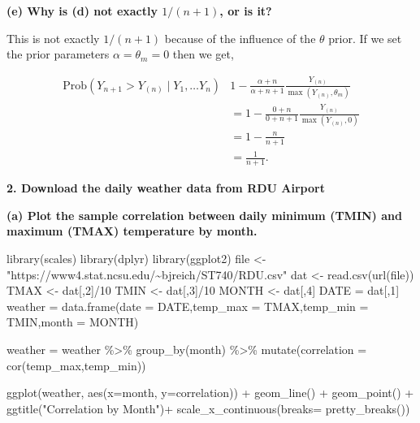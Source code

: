 \documentclass[
]{article}
\newenvironment{Shaded}{\begin{snugshade}}{\end{snugshade}}
\newcommand{\AttributeTok}[1]{\textcolor[rgb]{0.77,0.63,0.00}{#1}}
\newcommand{\DecValTok}[1]{\textcolor[rgb]{0.00,0.00,0.81}{#1}}
\newcommand{\FunctionTok}[1]{\textcolor[rgb]{0.00,0.00,0.00}{#1}}
\newcommand{\NormalTok}[1]{#1}
\newcommand{\OtherTok}[1]{\textcolor[rgb]{0.56,0.35,0.01}{#1}}
\newcommand{\SpecialCharTok}[1]{\textcolor[rgb]{0.00,0.00,0.00}{#1}}
\newcommand{\StringTok}[1]{\textcolor[rgb]{0.31,0.60,0.02}{#1}}
\begin{document}
\textbf{(e) Why is (d) not exactly \(1/(n+1)\), or is it?}

This is not exactly \(1/(n+1)\) because of the influence of the
\(\theta\) prior. If we set the prior parameters
\(\alpha = \theta_{m} = 0\) then we get,

\begin{align*}
\text{Prob}(Y_{n+1} > Y_{(n)} \mid Y_{1}, \dots Y_{n}) & 1 - \frac{\alpha +n  }{ \alpha + n + 1 } \frac{ Y_{(n)} }{  \max(Y_{(n)}, \theta_{m})} \\
  & = 1 - \frac{0 +n  }{ 0 + n + 1 } \frac{ Y_{(n)} }{  \max(Y_{(n)}, 0)} \\
  & = 1 - \frac{  n}{n+1  } \\
  & =\frac{ 1 }{  n+1}.
\end{align*}

\textbf{2. Download the daily weather data from RDU Airport}

\textbf{(a) Plot the sample correlation between daily minimum (TMIN) and
maximum (TMAX) temperature by month.}

\begin{Shaded}
\begin{Highlighting}[]
\FunctionTok{library}\NormalTok{(scales)}
\FunctionTok{library}\NormalTok{(dplyr)}
\FunctionTok{library}\NormalTok{(ggplot2)}
\NormalTok{file }\OtherTok{\textless{}{-}} \StringTok{"https://www4.stat.ncsu.edu/\textasciitilde{}bjreich/ST740/RDU.csv"}
\NormalTok{dat }\OtherTok{\textless{}{-}} \FunctionTok{read.csv}\NormalTok{(}\FunctionTok{url}\NormalTok{(file))}
\NormalTok{TMAX }\OtherTok{\textless{}{-}}\NormalTok{ dat[,}\DecValTok{2}\NormalTok{]}\SpecialCharTok{/}\DecValTok{10}
\NormalTok{TMIN }\OtherTok{\textless{}{-}}\NormalTok{ dat[,}\DecValTok{3}\NormalTok{]}\SpecialCharTok{/}\DecValTok{10}
\NormalTok{MONTH }\OtherTok{\textless{}{-}}\NormalTok{ dat[,}\DecValTok{4}\NormalTok{]}
\NormalTok{DATE }\OtherTok{=}\NormalTok{ dat[,}\DecValTok{1}\NormalTok{]}
\NormalTok{weather }\OtherTok{=} \FunctionTok{data.frame}\NormalTok{(}\AttributeTok{date =}\NormalTok{ DATE,}\AttributeTok{temp\_max =}\NormalTok{ TMAX,}\AttributeTok{temp\_min =}\NormalTok{ TMIN,}\AttributeTok{month =}\NormalTok{ MONTH)}

\NormalTok{weather }\OtherTok{=}\NormalTok{ weather }\SpecialCharTok{\%\textgreater{}\%} \FunctionTok{group\_by}\NormalTok{(month) }\SpecialCharTok{\%\textgreater{}\%} \FunctionTok{mutate}\NormalTok{(}\AttributeTok{correlation =} \FunctionTok{cor}\NormalTok{(temp\_max,temp\_min))}

\FunctionTok{ggplot}\NormalTok{(weather, }\FunctionTok{aes}\NormalTok{(}\AttributeTok{x=}\NormalTok{month, }\AttributeTok{y=}\NormalTok{correlation)) }\SpecialCharTok{+} \FunctionTok{geom\_line}\NormalTok{() }\SpecialCharTok{+} \FunctionTok{geom\_point}\NormalTok{() }\SpecialCharTok{+} \FunctionTok{ggtitle}\NormalTok{(}\StringTok{"Correlation by Month"}\NormalTok{)}\SpecialCharTok{+} \FunctionTok{scale\_x\_continuous}\NormalTok{(}\AttributeTok{breaks=} \FunctionTok{pretty\_breaks}\NormalTok{())}
\end{Highlighting}
\end{Shaded}
\end{document}

